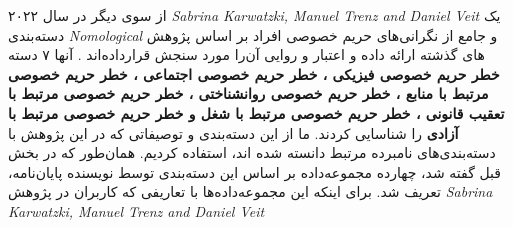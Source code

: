 

	از سوی دیگر
\fi %
\ifMultidimensionalNatureOfPrivacyRisksConceptualisationMeasurementAndImplicationsForDigitalServices
	در سال ۲۰۲۲
	\textit{
		\gls{Sabrina Karwatzki, Manuel Trenz and Daniel Veit}
	}
	 یک دسته‌بندی 
	\textit{
		\gls{Nomological}
	}
	و جامع از نگرانی‌های حریم خصوصی افراد بر اساس پژوهش های گذشته ارائه داده و اعتبار و روایی آن‌را مورد سنجش قرار‌داده‌اند
	\citep{karwatzkiMultidimensionalNaturePrivacy2022}
	\!.
	آنها ۷ دسته
	\textbf{
		خطر حریم خصوصی فیزیکی
		،
		خطر حریم خصوصی اجتماعی
		،
		خطر حریم خصوصی مرتبط با منابع
		،
		خطر حریم خصوصی روانشناختی
		،
		خطر حریم خصوصی مرتبط با تعقیب قانونی
		،
		خطر حریم خصوصی مرتبط با شغل
		\textmd{و}
		خطر حریم خصوصی مرتبط با آزادی
	}
\fi %
را شناسایی کردند. ما
از این دسته‌بندی و توصیفاتی که در این پژوهش با دسته‌بندی‌های نامبرده مرتبط دانسته شده اند، استفاده کردیم.
همان‌طور که در بخش قبل گفته شد، چهارده 
مجموعه‌داده
بر اساس این دسته‌بندی توسط نویسنده پایان‌نامه، تعریف  شد. برای اینکه این مجموعه‌داده‌ها با
تعاریفی که کاربران در پژوهش 
\textit{
	\gls{Sabrina Karwatzki, Manuel Trenz and Daniel Veit}
}
